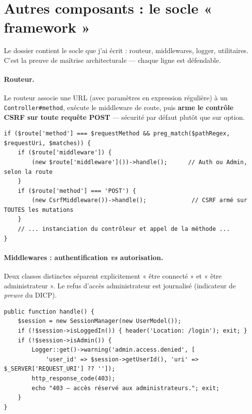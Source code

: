 \section{Autres composants : le socle « framework »}
\label{sec:framework}

Le dossier  contient le socle que j'ai écrit : routeur, middlewares, logger,
utilitaires. C'est la preuve de maîtrise architecturale — chaque ligne est défendable.

\paragraph{Routeur.} Le routeur associe une URL (avec paramètres en expression régulière) à un
\texttt{Controller\#method}, exécute le middleware de route, puis \textbf{arme le contrôle CSRF
sur toute requête POST} — sécurité par défaut plutôt que sur option.

\begin{lstlisting}[style=php, caption={Dispatch et armement du CSRF sur les POST — \file{src/Router.php}}]
if ($route['method'] === $requestMethod && preg_match($pathRegex, $requestUri, $matches)) {
    if ($route['middleware']) {
        (new $route['middleware']())->handle();      // Auth ou Admin, selon la route
    }
    if ($route['method'] === 'POST') {
        (new CsrfMiddleware())->handle();             // CSRF armé sur TOUTES les mutations
    }
    // ... instanciation du contrôleur et appel de la méthode ...
}
\end{lstlisting}

\paragraph{Middlewares : authentification \emph{vs} autorisation.} Deux classes distinctes
séparent explicitement « être connecté » et « être administrateur ». Le refus d'accès
administrateur est journalisé (indicateur de \emph{preuve} du DICP).

\begin{lstlisting}[style=php, caption={Middleware d'autorisation administrateur — \file{src/AdminMiddleware.php}}]
public function handle() {
    $session = new SessionManager(new UserModel());
    if (!$session->isLoggedIn()) { header('Location: /login'); exit; }
    if (!$session->isAdmin()) {
        Logger::get()->warning('admin.access.denied', [
            'user_id' => $session->getUserId(), 'uri' => $_SERVER['REQUEST_URI'] ?? '']);
        http_response_code(403);
        echo "403 — accès réservé aux administrateurs."; exit;
    }
}
\end{lstlisting}


